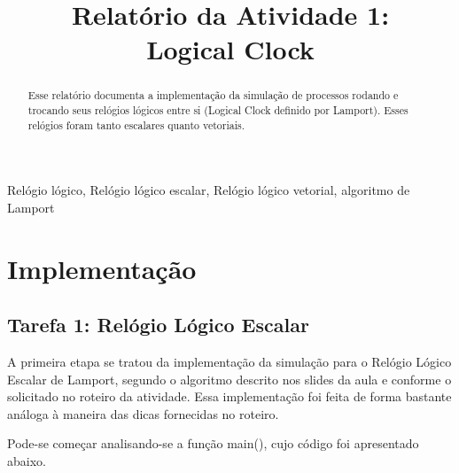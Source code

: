 \documentclass[conference]{IEEEtran}
\begin{document}
\title{Relatório da Atividade 1: \\ Logical Clock\\
}

\author{
}

\maketitle

\begin{abstract}
Esse relatório documenta a implementação da simulação de processos rodando e trocando seus relógios lógicos entre si (Logical Clock definido por Lamport). Esses relógios foram tanto escalares quanto vetoriais.
\end{abstract}

\begin{IEEEkeywords}
Relógio lógico, Relógio lógico escalar, Relógio lógico vetorial, algoritmo de Lamport
\end{IEEEkeywords}

\section{Implementação}

	\subsection{Tarefa 1: Relógio Lógico Escalar}
	
	A primeira etapa se tratou da implementação da simulação para o Relógio Lógico Escalar de Lamport, segundo o algoritmo descrito nos slides da aula e conforme o solicitado no roteiro da atividade. Essa implementação foi feita de forma bastante análoga à maneira das dicas fornecidas no roteiro.
	
	Pode-se começar analisando-se a função main(), cujo código foi apresentado abaixo.
	
\end{document}
